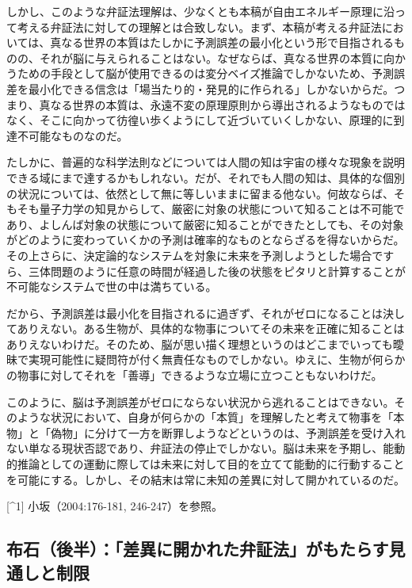 しかし、このような弁証法理解は、少なくとも本稿が自由エネルギー原理に沿って考える弁証法に対しての理解とは合致しない。まず、本稿が考える弁証法においては、真なる世界の本質はたしかに予測誤差の最小化という形で目指されるものの、それが脳に与えられることはない。なぜならば、真なる世界の本質に向かうための手段として脳が使用できるのは変分ベイズ推論でしかないため、予測誤差を最小化できる信念は「場当たり的・発見的に作られる」しかないからだ。つまり、真なる世界の本質は、永遠不変の原理原則から導出されるようなものではなく、そこに向かって彷徨い歩くようにして近づいていくしかない、原理的に到達不可能なものなのだ。

たしかに、普遍的な科学法則などについては人間の知は宇宙の様々な現象を説明できる域にまで達するかもしれない。だが、それでも人間の知は、具体的な個別の状況については、依然として無に等しいままに留まる他ない。何故ならば、そもそも量子力学の知見からして、厳密に対象の状態について知ることは不可能であり、よしんば対象の状態について厳密に知ることができたとしても、その対象がどのように変わっていくかの予測は確率的なものとならざるを得ないからだ。その上さらに、決定論的なシステムを対象に未来を予測しようとした場合ですら、三体問題のように任意の時間が経過した後の状態をピタリと計算することが不可能なシステムで世の中は満ちている。

だから、予測誤差は最小化を目指されるに過ぎず、それがゼロになることは決してありえない。ある生物が、具体的な物事についてその未来を正確に知ることはありえないわけだ。そのため、脳が思い描く理想というのはどこまでいっても曖昧で実現可能性に疑問符が付く無責任なものでしかない。ゆえに、生物が何らかの物事に対してそれを「善導」できるような立場に立つこともないわけだ。

このように、脳は予測誤差がゼロにならない状況から逃れることはできない。そのような状況において、自身が何らかの「本質」を理解したと考えて物事を「本物」と「偽物」に分けて一方を断罪しようなどというのは、予測誤差を受け入れない単なる現状否認であり、弁証法の停止でしかない。脳は未来を予期し、能動的推論としての運動に際しては未来に対して目的を立てて能動的に行動することを可能にする。しかし、その結末は常に未知の差異に対して開かれているのだ。

{[}\^{}1{]} 小坂（2004:176-181, 246-247）を参照。

\subsection{布石（後半）：「差異に開かれた弁証法」がもたらす見通しと制限}\label{ux5e03ux77f3ux5f8cux534aux5deeux7570ux306bux958bux304bux308cux305fux5f01ux8a3cux6cd5ux304cux3082ux305fux3089ux3059ux898bux901aux3057ux3068ux5236ux9650}

